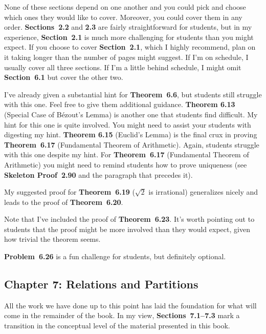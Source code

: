 \documentclass[11pt]{article}%
\newcommand{\blankline}{\pagebreak[2]\vspace{.5\baselineskip}}
\begin{document}
\blankline

None of these sections depend on one another and you could pick and choose which ones they would like to cover.  Moreover, you could cover them in any order.  \textbf{Sections~2.2} and \textbf{2.3} are fairly straightforward for students, but in my experience, \textbf{Section~2.1} is much more challenging for students than you might expect.  If you choose to cover  \textbf{Section~2.1}, which I highly recommend, plan on it taking longer than the number of pages might suggest.  If I'm on schedule, I usually cover all three sections.  If I'm a little behind schedule, I might omit \textbf{Section~6.1} but cover the other two.

\blankline

I've already given a substantial hint for \textbf{Theorem~6.6}, but students still struggle with this one.  Feel free to give them additional guidance.  \textbf{Theorem 6.13} (Special Case of B\'ezout's Lemma) is another one that students find difficult.  My hint for this one is quite involved.  You might need to assist your students with digesting my hint.  \textbf{Theorem 6.15} (Euclid's Lemma) is the final crux in proving \textbf{Theorem~6.17} (Fundamental Theorem of Arithmetic).  Again, students struggle with this one despite my hint.  For \textbf{Theorem~6.17} (Fundamental Theorem of Arithmetic) you might need to remind students how to prove uniqueness (see \textbf{Skeleton Proof~2.90} and the paragraph that precedes it).

\blankline

My suggested proof for \textbf{Theorem~6.19} ($\sqrt{2}$ is irrational) generalizes nicely and leads to the proof of \textbf{Theorem~6.20}.

\blankline

Note that I've included the proof of \textbf{Theorem~6.23}. It's worth pointing out to students that the proof might be more involved than they would expect, given how trivial the theorem seems.

\blankline

\textbf{Problem~6.26} is a fun challenge for students, but definitely optional. 


\subsection*{Chapter 7: Relations and Partitions}

All the work we have done up to this point has laid the foundation for what will come in the remainder of the book. In my view, \textbf{Sections~7.1--7.3} mark a transition in the conceptual level of the material presented in this book.  
\end{document}
